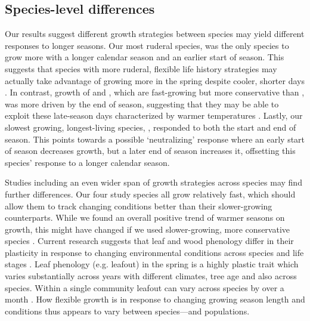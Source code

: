 \documentclass{article}\usepackage[]{graphicx}\usepackage[]{xcolor}
\begin{document}
\subsection*{Species-level differences}
Our results suggest different growth strategies between species may yield different responses to longer seasons. Our most ruderal species, {\Ainc} was the only species to grow more with a longer calendar season and an earlier start of season. This suggests that species with more ruderal, flexible life history strategies may actually take advantage of growing more in the spring despite cooler, shorter days \citep{grime_evidence_1977,furlow_alnus_1997}. In contrast, growth of {\Bpap} and {\Bpop}, which are fast-growing but more conservative than {\Ainc}, was more driven by the end of season, suggesting that they may be able to exploit these late-season days characterized by warmer temperatures \citep{burns_silvics_1990}. Lastly, our slowest growing, longest-living species, {\Ball}, responded to both the start and end of season. This points towards a possible `neutralizing' response where an early start of season decreases growth, but a later end of season increases it, offsetting this species' response to a longer calendar season. 

Studies including an even wider span of growth strategies across species may find further differences. Our four study species all grow relatively fast, which should allow them to track changing conditions better than their slower-growing counterparts. While we found an overall positive trend of warmer seasons on growth, this might have changed if we used slower-growing, more conservative species \citep[such as \textit{Quercus};][]{burns_silvics_1990}. Current research suggests that leaf and wood phenology differ in their plasticity in response to changing environmental conditions across species and life stages \citep{dox_wood_2022}. Leaf phenology (e.g. leafout) in the spring is a highly plastic trait which varies substantially across years with different climates, tree age and also across species. Within a single community leafout can vary across species by over a month \citep{wolkovich_progress_2014}. How flexible growth is in response to changing growing season length and conditions thus appears to vary between species---and populations. 
\end{document}
